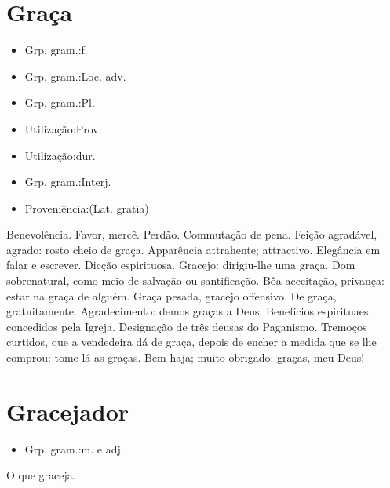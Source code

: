 \section{Graça}
\begin{itemize}
\item {Grp. gram.:f.}
\end{itemize}
\begin{itemize}
\item {Grp. gram.:Loc. adv.}
\end{itemize}
\begin{itemize}
\item {Grp. gram.:Pl.}
\end{itemize}
\begin{itemize}
\item {Utilização:Prov.}
\end{itemize}
\begin{itemize}
\item {Utilização:dur.}
\end{itemize}
\begin{itemize}
\item {Grp. gram.:Interj.}
\end{itemize}
\begin{itemize}
\item {Proveniência:(Lat. \textunderscore gratia\textunderscore )}
\end{itemize}
Benevolência.
Favor, mercê.
Perdão.
Commutação de pena.
Feição agradável, agrado: \textunderscore rosto cheio de graça\textunderscore .
Apparência attrahente; attractivo.
Elegância em falar e escrever.
Dicção espirituosa.
Gracejo: \textunderscore dirigiu-lhe uma graça\textunderscore .
Dom sobrenatural, como meio de salvação ou santificação.
Bôa acceitação, privança: \textunderscore estar na graça de alguém\textunderscore .
\textunderscore Graça pesada\textunderscore , gracejo offensivo.
\textunderscore De graça\textunderscore , gratuitamente.
Agradecimento: \textunderscore demos graças a Deus\textunderscore .
Benefícios espirituaes concedidos pela Igreja.
Designação de três deusas do Paganismo.
Tremoços curtidos, que a vendedeira dá de graça, depois de encher a medida que se lhe comprou: \textunderscore tome lá as graças\textunderscore .
Bem haja; muito obrigado: \textunderscore graças, meu Deus\textunderscore !
\section{Gracejador}
\begin{itemize}
\item {Grp. gram.:m.  e  adj.}
\end{itemize}
O que graceja.
